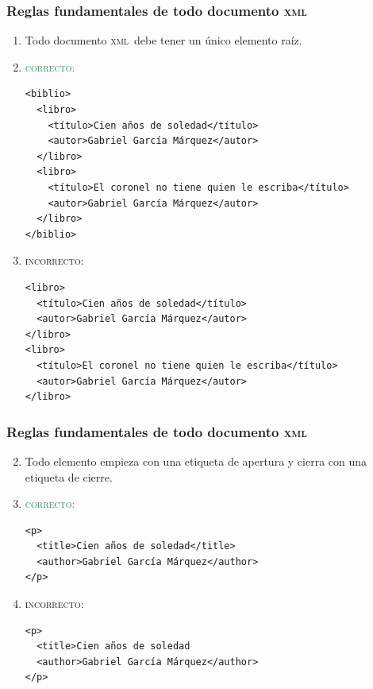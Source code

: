 \documentclass[%
  handout, %
  ]{beamer}
\newcommand*{\rojo}[1]{\textcolor[HTML]{8B0000}{#1}}
\newcommand*{\verde}[1]{\textcolor{seagreen}{#1}}
\newcommand*{\XML}{\textsc{xml}}
\begin{document}
\begin{frame}[fragile]
  \frametitle{Reglas fundamentales de todo documento \XML}
  \begin{enumerate}
    \item Todo documento \XML\ debe tener un único elemento raíz.
    \item[] \verde{\textsc{correcto}:}
      \scriptsize
\begin{verbatim}
<biblio>
  <libro>
    <título>Cien años de soledad</título>
    <autor>Gabriel García Márquez</autor>
  </libro>
  <libro>
    <título>El coronel no tiene quien le escriba</título>
    <autor>Gabriel García Márquez</autor>
  </libro>
</biblio>
\end{verbatim}

    \item[] \rojo{\textsc{incorrecto}:}
       \scriptsize
\begin{verbatim}
<libro>
  <título>Cien años de soledad</título>
  <autor>Gabriel García Márquez</autor>
</libro>
<libro>
  <título>El coronel no tiene quien le escriba</título>
  <autor>Gabriel García Márquez</autor>
</libro>
\end{verbatim}
  \end{enumerate}
\end{frame}

\begin{frame}[fragile]
  \frametitle{Reglas fundamentales de todo documento \XML}
  \begin{enumerate}
      \setcounter{enumi}{1}  
    \item Todo elemento empieza con una etiqueta de apertura y cierra con una etiqueta de cierre.

    \item[] \verde{\textsc{correcto}:}
\begin{verbatim}
<p>
  <title>Cien años de soledad</title>
  <author>Gabriel García Márquez</author>
</p>
\end{verbatim}

    \item[] \rojo{\textsc{incorrecto}:}
\begin{verbatim}
<p>
  <title>Cien años de soledad
  <author>Gabriel García Márquez</author>
</p>
\end{verbatim}
      
  \end{enumerate}
\end{frame}
\end{document}

